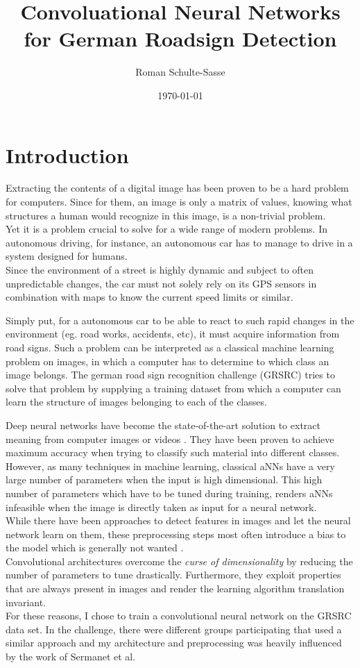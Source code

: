 \documentclass[11pt,a4paper]{article}
\title{Convoluational Neural Networks for German Roadsign Detection}
\author{Roman Schulte-Sasse}
\date{\today}
\begin{document}
\maketitle
\clearpage


\section{Introduction}
Extracting the contents of a digital image has been proven to be a hard problem for computers. Since for them, an image is only a matrix of values, knowing what structures a human would recognize in this image, is a non-trivial problem.\\
Yet it is a problem crucial to solve for a wide range of modern problems. In autonomous driving, for instance, an autonomous car has to manage to drive in a system designed for humans.\\
Since the environment of a street is highly dynamic and subject to often unpredictable changes, the car must not solely rely on its GPS sensors in combination with maps to know the current speed limits or similar.

Simply put, for a autonomous car to be able to react to such rapid changes in the environment (eg. road works, accidents, etc), it must acquire information from road signs.
Such a problem can be interpreted as a classical machine learning problem on images, in which a computer has to determine to which class an image belongs.
The german road sign recognition challenge (GRSRC) tries to solve that problem by supplying a training dataset from which a computer can learn the structure of images belonging to each of the classes.

Deep neural networks have become the state-of-the-art solution to extract meaning from computer images or videos \cite{lecunConvADF}. They have been proven to achieve maximum accuracy when trying to classify such material into different classes. However, as many techniques in machine learning, classical aNNs have a very large number of parameters when the input is high dimensional. This high number of parameters which have to be tuned during training, renders aNNs infeasible when the image is directly taken as input for a neural network.\\
While there have been approaches to detect features in images and let the neural network learn on them, these preprocessing steps most often introduce a bias to the model which is generally not wanted \cite{shamir2010pattern}.\\
Convolutional architectures overcome the \textit{curse of dimensionality} by reducing the number of parameters to tune drastically. Furthermore, they exploit properties that are always present in images and render the learning algorithm translation invariant.\\
For these reasons, I chose to train a convolutional neural network on the GRSRC data set. In the challenge, there were different groups participating that used a similar approach and my architecture and preprocessing was heavily influenced by the work of Sermanet et al. \cite{sermanet2011traffic}
\end{document}
